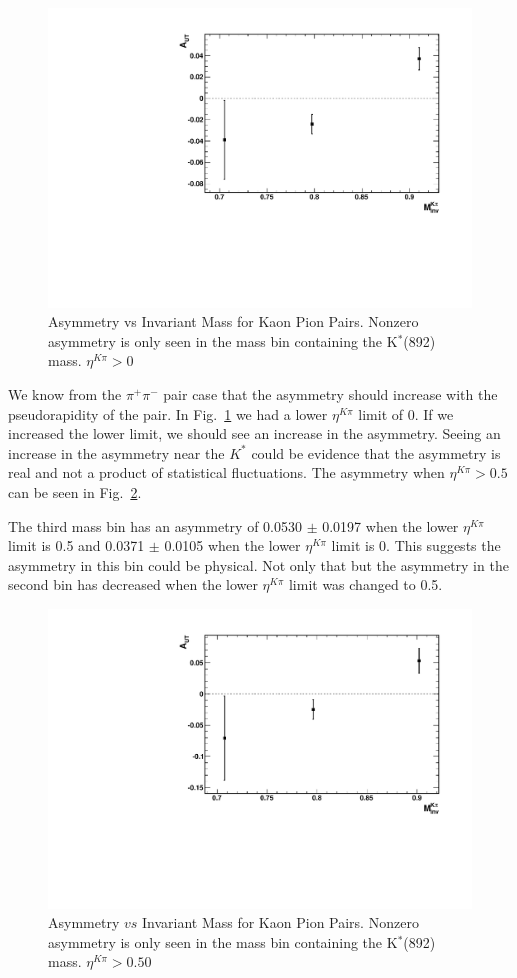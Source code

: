 \documentclass[letterpaper, abstract = on,listof=totoc, bibliography=totoc]{scrreprt}
\newcommand{\pip}{\pi^+}
\newcommand{\pim}{\pi^-}
\newcommand{\pair}{$\pip\pim$ }
\newcommand{\etakp}{\eta^{K\pi}}
\begin{document}
\begin{figure}
\begin{center}
\includegraphics[width = .6\textwidth]{AutVMass_KPi}
\caption[Asymmetry vs Invariant Mass for Kaon Pion Pairs]{Asymmetry vs Invariant Mass for Kaon Pion Pairs. Nonzero asymmetry is only seen in the mass bin containing the K$^*$(892) mass. $\etakp > 0$}
\label{fig:AutVMass_KPi}
\end{center}
\end{figure}




We know from the \pair pair case that the asymmetry should increase with the pseudorapidity of the pair. In Fig.~\ref{fig:AutVMass_KPi} we had a lower $\etakp$ limit of 0. If we increased the lower limit, we should see an increase in the asymmetry. Seeing an increase in the asymmetry near the $K^*$ could be evidence that the asymmetry is real and not a product of statistical fluctuations. The asymmetry when $\etakp > 0.5$ can be seen in Fig.~\ref{fig:AutVMass_KPi_eta050}. 

The third mass bin has an asymmetry of 0.0530 $\pm$ 0.0197 when the lower $\etakp$ limit is 0.5 and 0.0371 $\pm$ 0.0105 when the lower $\etakp$ limit is 0. This suggests the asymmetry in this bin could be physical. Not only that but the asymmetry in the second bin has decreased when the lower $\etakp$ limit was changed to 0.5. 

\begin{figure}
\begin{center}
\includegraphics[width = .6\textwidth]{AsymVsM_eta050}
\caption[Asymmetry $vs$ Invariant Mass for Kaon Pion Pairs]{Asymmetry $vs$ Invariant Mass for Kaon Pion Pairs. Nonzero asymmetry is only seen in the mass bin containing the K$^*$(892) mass. $\etakp > 0.50$}
\label{fig:AutVMass_KPi_eta050}
\end{center}
\end{figure}
\end{document}
